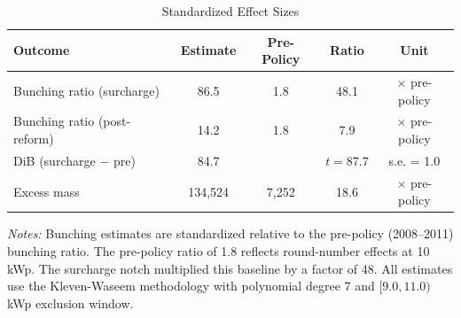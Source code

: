 \begin{table}[t]
\centering
\caption{Standardized Effect Sizes}
\label{tab:sde}
\begin{tabular}{lcccc}
\toprule
Outcome & Estimate & Pre-Policy & Ratio & Unit \\
\midrule
Bunching ratio (surcharge) & 86.5 & 1.8 & 48.1 & $\times$ pre-policy \\
Bunching ratio (post-reform) & 14.2 & 1.8 & 7.9 & $\times$ pre-policy \\
DiB (surcharge $-$ pre) & 84.7 & & $t = 87.7$ & s.e. = 1.0 \\
Excess mass & 134,524 & 7,252 & 18.6 & $\times$ pre-policy \\
\bottomrule
\end{tabular}
\begin{flushleft}\small \textit{Notes:} Bunching estimates are standardized relative to the pre-policy (2008--2011) bunching ratio. The pre-policy ratio of 1.8 reflects round-number effects at 10 kWp. The surcharge notch multiplied this baseline by a factor of 48. All estimates use the Kleven-Waseem methodology with polynomial degree 7 and $[9.0, 11.0)$ kWp exclusion window.\end{flushleft}
\end{table}
